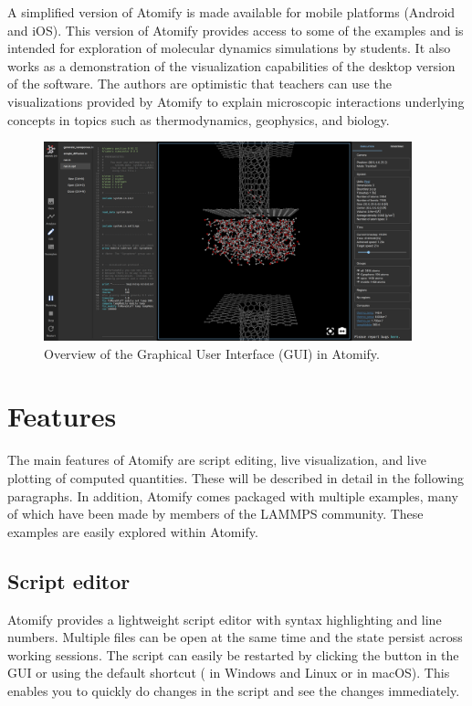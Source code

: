 \documentclass[aps,pre,twocolumn,letterpaper,floatfix,nofootinbib]{revtex4}
\begin{document}
A simplified version of Atomify is made available for mobile platforms (Android
and iOS).
This version of Atomify provides access to some of the examples and is intended
for exploration of molecular dynamics simulations by students.
It also works as a demonstration of the visualization capabilities of the
desktop version of the software.
The authors are optimistic that teachers can use the visualizations provided by
Atomify to explain microscopic interactions underlying concepts in topics such
as thermodynamics, geophysics, and biology.
\begin{figure}
	\centering
	\includegraphics[width=0.95\textwidth]{gui.png}
	\caption{Overview of the Graphical User Interface (GUI) in Atomify.}
	\label{fig:gui}
\end{figure}
\section{Features}

The main features of Atomify are script editing,
live visualization, and live plotting of computed quantities.
These will be described in detail in the following paragraphs.
In addition, Atomify comes packaged with multiple examples,
many of which have been made by members of the LAMMPS community.
These examples are easily explored within Atomify.


\subsection{Script editor}

Atomify provides a lightweight script editor with syntax highlighting and line
numbers.
Multiple files can be open at the same time and the state persist across working sessions.
The script can easily be restarted by clicking the button in the GUI or using
the default shortcut ( in Windows and Linux or  in macOS).
This enables you to quickly do changes in the script and see the changes immediately. 
\end{document}
